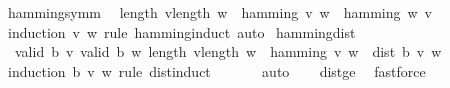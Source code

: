 \begin{isabellebody}
\endisatagproof
{\isafoldproof}%
%
\isadelimproof
\isanewline
%
\endisadelimproof
\isanewline
{}\isamarkupfalse%
\ hamming{\isacharunderscore}{\kern0pt}symm{\isacharcolon}{\kern0pt}\isanewline
\ \ {\isachardoublequoteopen}length\ v{\isacharequal}{\kern0pt}length\ w\ {\isasymLongrightarrow}\ hamming\ v\ w\ {\isacharequal}{\kern0pt}\ hamming\ w\ v{\isachardoublequoteclose}\isanewline
%
\isadelimproof
\ \ %
\endisadelimproof
%
\isatagproof
{}\isamarkupfalse%
\ {\isacharparenleft}{\kern0pt}induction\ v\ w\ rule{\isacharcolon}{\kern0pt}\ hamming{\isachardot}{\kern0pt}induct{\isacharparenright}{\kern0pt}\ auto%
\endisatagproof
{\isafoldproof}%
%
\isadelimproof
\isanewline
%
\endisadelimproof
\isanewline
{}\isamarkupfalse%
\ hamming{\isacharunderscore}{\kern0pt}dist{\isacharcolon}{\kern0pt}\isanewline
\ \ {\isachardoublequoteopen}{\isasymlbrakk}valid\ b\ v{\isacharsemicolon}{\kern0pt}\ valid\ b\ w{\isacharsemicolon}{\kern0pt}\ length\ v{\isacharequal}{\kern0pt}length\ w{\isasymrbrakk}\ {\isasymLongrightarrow}\ hamming\ v\ w\ {\isasymle}\ dist\ b\ v\ w{\isachardoublequoteclose}\isanewline
%
\isadelimproof
\ \ %
\endisadelimproof
%
\isatagproof
{}\isamarkupfalse%
\ {\isacharparenleft}{\kern0pt}induction\ b\ v\ w\ rule{\isacharcolon}{\kern0pt}\ dist{\isachardot}{\kern0pt}induct{\isacharparenright}{\kern0pt}\isanewline
\ \ \ \ \ \isamarkupfalse%
\ auto\isanewline
\ \ \isamarkupfalse%
\ dist{}{\isacharunderscore}{\kern0pt}ge{}\ \isamarkupfalse%
\ fastforce%
\endisatagproof
{\isafoldproof}%
%
\isadelimproof
\isanewline
%
\endisadelimproof
%
\isadelimtheory
\isanewline
%
\endisadelimtheory
%
\isatagtheory
{}\isamarkupfalse%
%
\endisatagtheory
{\isafoldtheory}%
%
\isadelimtheory
%
\endisadelimtheory
%
\end{isabellebody}%
\endinput
